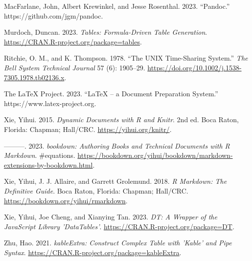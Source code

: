 \begin{CSLReferences}{1}{0}
\leavevmode{}%
MacFarlane, John, Albert Krewinkel, and Jesse Rosenthal. 2023. {``Pandoc.''} https://github.com/jgm/pandoc.

\leavevmode{}%
Murdoch, Duncan. 2023. \emph{Tables: Formula-Driven Table Generation}. \url{https://CRAN.R-project.org/package=tables}.

\leavevmode{}%
Ritchie, O. M., and K. Thompson. 1978. {``The UNIX Time-Sharing System.''} \emph{The Bell System Technical Journal} 57 (6): 1905--29. \url{https://doi.org/10.1002/j.1538-7305.1978.tb02136.x}.

\leavevmode{}%
The LaTeX Project. 2023. {``LaTeX -- a Document Preparation System.''} https://www.latex-project.org.

\leavevmode{}%
Xie, Yihui. 2015. \emph{Dynamic Documents with {R} and Knitr}. 2nd ed. Boca Raton, Florida: Chapman; Hall/CRC. \url{https://yihui.org/knitr/}.

\leavevmode{}%
---------. 2023. \emph{{bookdown: Authoring Books and Technical Documents with R Markdown}}. \#equations. \url{https://bookdown.org/yihui/bookdown/markdown-extensions-by-bookdown.html}.

\leavevmode{}%
Xie, Yihui, J. J. Allaire, and Garrett Grolemund. 2018. \emph{R Markdown: The Definitive Guide}. Boca Raton, Florida: Chapman; Hall/CRC. \url{https://bookdown.org/yihui/rmarkdown}.

\leavevmode{}%
Xie, Yihui, Joe Cheng, and Xianying Tan. 2023. \emph{DT: A Wrapper of the JavaScript Library 'DataTables'}. \url{https://CRAN.R-project.org/package=DT}.

\leavevmode{}%
Zhu, Hao. 2021. \emph{kableExtra: Construct Complex Table with 'Kable' and Pipe Syntax}. \url{https://CRAN.R-project.org/package=kableExtra}.

\end{CSLReferences}



\address{%
Abhishek Ulayil\\
Institute of Actuaries of India (student)\\%
Mumbai, India\\
%
%
\textit{ORCiD: \href{https://orcid.org/0009-0000-6935-8690}{0009-0000-6935-8690}}\\%
\href{mailto:perricoq@outlook.com}{\nolinkurl{perricoq@outlook.com}}%
}

